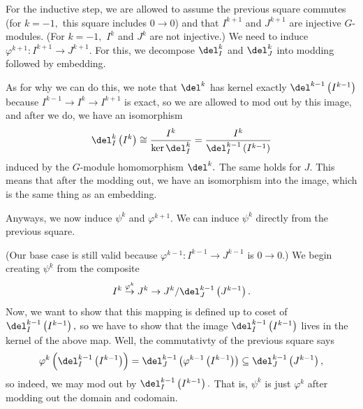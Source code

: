 For the inductive step, we are allowed to assume the previous square commutes (for $k=-1,$ this square includes $0\to 0$) and that $I^{k+1}$ and $J^{k+1}$ are injective $G$-modules. (For $k=-1,$ $I^k$ and $J^k$ are not injective.) We need to induce $\varphi^{k+1}:I^{k+1}\to J^{k+1}.$ For this, we decompose $\del^k_I$ and $\del^k_J$ into modding followed by embedding.
\begin{center}
\end{center}
As for why we can do this, we note that $\del^k$ has kernel exactly $\del^{k-1}\left(I^{k-1}\right)$ because $I^{k-1}\to I^k\to I^{k+1}$ is exact, so we are allowed to mod out by this image, and after we do, we have an isomorphism
\[\del^k_I\left(I^k\right)\cong\frac{I^k}{\ker\del^k_I}=\frac{I^k}{\del^{k-1}_I\left(I^{k-1}\right)}\]
induced by the $G$-module homomorphism $\del^k.$ The same holds for $J.$ This means that after the modding out, we have an isomorphism into the image, which is the same thing as an embedding.

Anyways, we now induce $\psi^k$ and $\varphi^{k+1}.$ We can induce $\psi^k$ directly from the previous square.
\begin{center}
\end{center}
(Our base case is still valid because $\varphi^{k-1}:I^{k-1}\to J^{k-1}$ is $0\to 0.$) We begin creating $\psi^k$ from the composite
\[I^k\stackrel{\varphi^k}\to J^k\to J^k/\del_J^{k-1}\left(J^{k-1}\right).\]
Now, we want to show that this mapping is defined up to coset of $\del^{k-1}_I\left(I^{k-1}\right),$ so we have to show that the image $\del_I^{k-1}\left(I^{k-1}\right)$ lives in the kernel of the above map. Well, the commutativty of the previous square says
\[\varphi^k\left(\del_I^{k-1}\left(I^{k-1}\right)\right)=\del_J^{k-1}\left(\varphi^{k-1}\left(I^{k-1}\right)\right)\subseteq\del_J^{k-1}\left(J^{k-1}\right),\]
so indeed, we may mod out by $\del_I^{k-1}\left(I^{k-1}\right).$ That is, $\psi^k$ is just $\varphi^k$ after modding out the domain and codomain.

